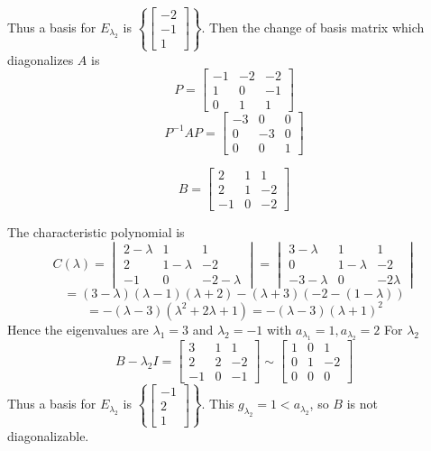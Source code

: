 \documentclass[english, 12pt]{article}
\begin{document}
\begin{exmp}
\begin{sol}
Thus a basis for $E_{\lambda_2}$ is $\left\{\begin{bmatrix} -2 \\ -1 \\ 1 \end{bmatrix}\right\}$.\n
Then the change of basis matrix which diagonalizes $A$ is
\[P = \begin{bmatrix} -1 & -2 & -2 \\ 1 & 0 & -1 \\ 0 & 1 & 1 \end{bmatrix}\]
\[P^{-1}AP = \begin{bmatrix} -3 & 0 & 0 \\ 0 & -3 & 0 \\ 0 & 0 & 1 \end{bmatrix}\]
\end{sol}
\end{exmp}

\begin{exmp}
\[B = \begin{bmatrix} 2 & 1 & 1 \\ 2 & 1 & -2 \\ -1 & 0 & -2\end{bmatrix}\]
\begin{sol}
The characteristic polynomial is
\[C(\lambda) = \begin{vmatrix} 2- \lambda & 1 & 1 \\ 2 & 1 -\lambda& -2 \\ -1 & 0 & -2 - \lambda\end{vmatrix} = \begin{vmatrix} 3 - \lambda & 1 & 1 \\ 0 & 1 -\lambda & -2 \\ -3 -\lambda & 0 & -2 \lambda \end{vmatrix}\]
\[=(3-\lambda)(\lambda-1)(\lambda+2) - (\lambda+3)(-2-(1-\lambda))\]
\[=-(\lambda-3)(\lambda^2 + 2\lambda + 1) = - (\lambda-3)(\lambda+1)^2\]
Hence the eigenvalues are $\lambda_1 = 3$ and $\lambda_2 = -1$ with $a_{\lambda_1} = 1,a_{\lambda_2} = 2$
For $\lambda_2$
\[B-\lambda_2I = \begin{bmatrix} 3 & 1 & 1 \\2 & 2 & -2 \\ -1 & 0 & -1 \end{bmatrix} \sim \begin{bmatrix} 1 & 0 & 1 \\ 0 & 1 & -2 \\ 0 & 0 & 0\end{bmatrix}\]
Thus a basis for $E_{\lambda_2}$ is $\left\{\begin{bmatrix} -1 \\ 2 \\ 1 \end{bmatrix} \right\}$. This $g_{\lambda_2} = 1 < a_{\lambda_2}$, so $B$ is not diagonalizable.
\end{sol}
\end{exmp}
\end{document}

